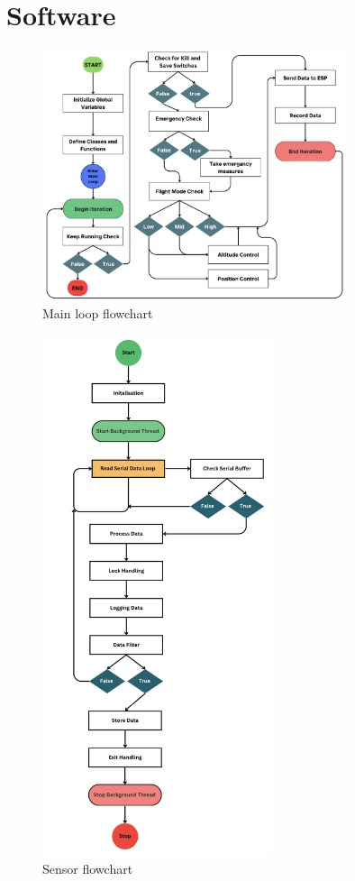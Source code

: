 \documentclass{article}
\begin{document}
\section{Software}
\begin{figure}[H]
  \centering
  \includegraphics[width=0.8\textwidth]{Pictures/main_loop_flowchart.png}
  \caption{Main loop flowchart}
  \label{fig:main_loop_flowchart}
\end{figure}

\begin{figure}[H]
  \centering
  \includegraphics[width=0.6\textwidth]{Pictures/sensor_flowchart.png}
  \caption{Sensor flowchart}
  \label{fig:Sensor_flowchart}
\end{figure}
\end{document}
